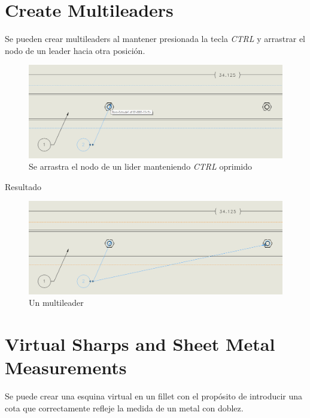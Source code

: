 \documentclass[12pt,letterpaper,final]{report}
\begin{document}
\chapter{Create Multileaders}

Se pueden crear multileaders al mantener presionada la tecla \emph{CTRL} y arrastrar el nodo de un leader hacia otra posición.

\begin{figure}[H]
	\centering
	\includegraphics[width=0.85\linewidth, height=0.5\textheight,keepaspectratio]{Imagenes/solidworks_multileader01}
	\caption{Se arrastra el nodo de un lider manteniendo \emph{CTRL} oprimido}
	\label{fig:solidworksmultileader01}
\end{figure}


\pagebreak

{\LARGE Resultado}

\begin{figure}[H]
	\centering
	\includegraphics[width=0.85\linewidth, height=0.5\textheight,keepaspectratio]{Imagenes/solidworks_multileader02}
	\caption{Un multileader}
	\label{fig:solidworksmultileader02}
\end{figure}

\chapter{Virtual Sharps and Sheet Metal Measurements}

Se puede crear una esquina virtual en un fillet con el propósito de introducir una cota que correctamente refleje la medida de un metal con doblez.
\end{document}
